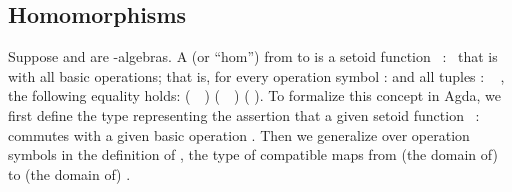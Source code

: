 \subsection{Homomorphisms}\label{homomorphisms}
Suppose  and  are -algebras. A  (or ``hom'') from
 to  is a setoid function ~:~  
that is  with all basic operations; that is, for
every operation symbol  :  and all tuples
 : ~  , the following
equality holds:   (~~)  
(~~)      ( ).
To formalize this concept in Agda, we first define the type 
representing the assertion that a given setoid function
~:~   commutes with a given
basic operation . Then we generalize over operation symbols in the definition
of , the type of compatible maps from (the domain of)  to
(the domain of) .

